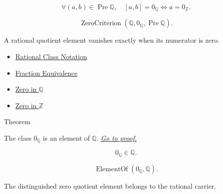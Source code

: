 \begin{remark*}
\[
\forall (a,b)\in\operatorname{Pre}\mathbb{Q},\quad
[a,b]=0_{\mathbb{Q}}\Longleftrightarrow a=0_{\mathbb{Z}}.
\]
\end{remark*}

\begin{remark*}
\[
\operatorname{ZeroCriterion}(\mathbb{Q},0_{\mathbb{Q}},\operatorname{Pre}\mathbb{Q}).
\]
\end{remark*}

\begin{remark*}[Interpretation]
A rational quotient element vanishes exactly when its numerator is zero.
\end{remark*}

\begin{dependencies}
\begin{itemize}
  \item \hyperref[def:rational-class-notation]{Rational Class Notation}
  \item \hyperref[def:fraction-equivalence]{Fraction Equivalence}
  \item
 \hyperref[def:zero-in-q]{Zero in $\mathbb{Q}$}
  \item \hyperref[def:zero-in-z]{Zero in $\mathbb{Z}$}
\end{itemize}
\end{dependencies}

\begin{theorembox}{Theorem}
\begin{theorem}
\label{thm:zero-is-a-rational}
The class $0_{\mathbb{Q}}$ is an element of $\mathbb{Q}$.
\hyperref[prf:zero-is-a-rational]{\textit{Go to proof.}}
\end{theorem}
\end{theorembox}

\begin{remark*}
\[
0_{\mathbb{Q}}\in\mathbb{Q}.
\]
\end{remark*}

\begin{remark*}
\[
\operatorname{ElementOf}(0_{\mathbb{Q}},\mathbb{Q}).
\]
\end{remark*}

\begin{remark*}[Interpretation]
The distinguished zero quotient element belongs to the rational carrier.
\end{remark*}


